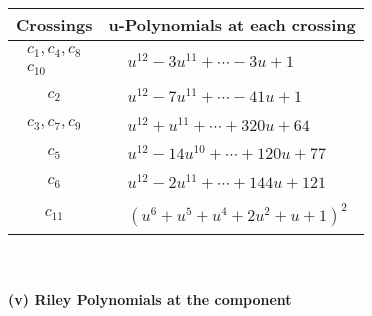 \documentclass[1p]{elsarticle_modified}
\theoremstyle{definition}
\begin{document}
\begin{tabular}{m{50pt}|m{274pt}}
Crossings & \hspace{64pt}u-Polynomials at each crossing \\
\hline $$\begin{aligned}c_{1},c_{4},c_{8}\\c_{10}\end{aligned}$$&$\begin{aligned}
&u^{12}-3 u^{11}+\cdots-3 u+1
\end{aligned}$\\
\hline $$\begin{aligned}c_{2}\end{aligned}$$&$\begin{aligned}
&u^{12}-7 u^{11}+\cdots-41 u+1
\end{aligned}$\\
\hline $$\begin{aligned}c_{3},c_{7},c_{9}\end{aligned}$$&$\begin{aligned}
&u^{12}+u^{11}+\cdots+320 u+64
\end{aligned}$\\
\hline $$\begin{aligned}c_{5}\end{aligned}$$&$\begin{aligned}
&u^{12}-14 u^{10}+\cdots+120 u+77
\end{aligned}$\\
\hline $$\begin{aligned}c_{6}\end{aligned}$$&$\begin{aligned}
&u^{12}-2 u^{11}+\cdots+144 u+121
\end{aligned}$\\
\hline $$\begin{aligned}c_{11}\end{aligned}$$&$\begin{aligned}
&(u^6+u^5+u^4+2 u^2+u+1)^2
\end{aligned}$\\
\hline
\end{tabular}\\~\\
\newpage\renewcommand{\arraystretch}{1}
\flushleft \textbf{(v) Riley Polynomials at the component}\newline \\
\end{document}
